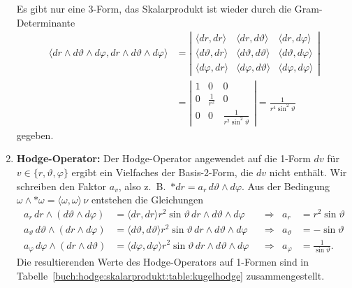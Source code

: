\begin{enumerate}
Es gibt nur eine 3-Form, das Skalarprodukt ist wieder durch die 
Gram-Determinante
\begin{align*}
\langle
dr\wedge d\vartheta \wedge d\varphi,
dr\wedge d\vartheta \wedge d\varphi
\rangle
&=
\left|
\begin{matrix}
\langle dr, dr \rangle
&\langle dr, d\vartheta \rangle
&\langle dr, d\varphi \rangle
\\
\langle d\vartheta, dr \rangle
&\langle d\vartheta, d\vartheta \rangle
&\langle d\vartheta, d\varphi \rangle
\\
\langle d\varphi, dr \rangle
&\langle d\varphi, d\vartheta \rangle
&\langle d\varphi, d\varphi \rangle
\end{matrix}
\right|
\\
&=
\left|\begin{matrix}
1 & 0 & 0 \\
0 & \frac{1}{r^2} & 0 \\
0 & 0 & \frac{1}{r^2\sin^2\vartheta}
\end{matrix}\right|
=
\frac{1}{r^4\sin^2\vartheta}
\end{align*}
gegeben.
\item {\bf Hodge-Operator:}
Der Hodge-Operator angewendet auf die 1-Form $dv$ für
$v\in\{r,\vartheta,\varphi\}$  ergibt ein Vielfaches der Basis-2-Form,
die $dv$ nicht enthält.
Wir schreiben den Faktor $a_v$, also
z.~B.~$*dr = a_r\,d\vartheta\wedge d\varphi$.
Aus der Bedingung $\omega\wedge {\ast\omega}=\langle\omega,\omega\rangle\,\nu$
entstehen die Gleichungen
\begin{align*}
a_r\,
dr\wedge(d\vartheta\wedge d\varphi)
&=
\langle dr, dr\rangle
r^2\sin\vartheta\, dr\wedge d\vartheta\wedge d\varphi
&&\Rightarrow&
a_r &= r^2 \sin\vartheta
\\
a_\vartheta\,
d\vartheta \wedge(dr \wedge d\varphi)
&=
\langle d\vartheta,d\vartheta\rangle
r^2\sin\vartheta\,dr\wedge d\vartheta\wedge d\varphi
&&\Rightarrow&
a_\vartheta &= -\sin\vartheta
\\
a_\varphi\,
d\varphi \wedge(dr \wedge d\vartheta)
&=
\langle d\varphi,d\varphi\rangle
r^2\sin\vartheta\,dr\wedge d\vartheta\wedge d\varphi
&&\Rightarrow&
a_\varphi &= \frac{1}{\sin\vartheta}.
\end{align*}
Die resultierenden Werte des Hodge-Operators auf 1-Formen sind in
Tabelle~\ref{buch:hodge:skalarprodukt:table:kugelhodge} zusammengestellt.


\end{enumerate}
